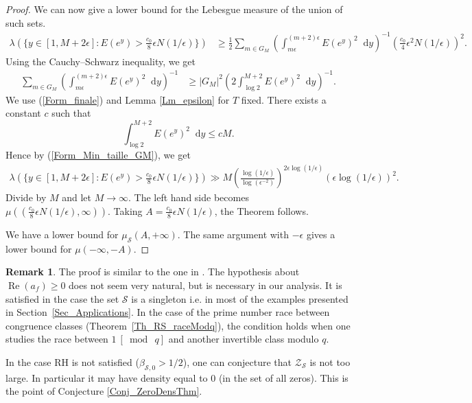\documentclass[a4paper,10pt]{amsart}
\theoremstyle{plain}
\theoremstyle{definition}
\newtheorem{Rk}{Remark}
\begin{document}
\begin{proof}
We can now give a lower bound for the Lebesgue measure of the union of such sets.
\begin{align*}
\lambda\left(\lbrace y\in [1,M+2\epsilon] : E(e^{y})> \frac{c_{0}}{8}\epsilon N(1/\epsilon) \rbrace\right)
&\geq \frac{1}{2} \sum_{m\in G_{M}} \left(\int_{m\epsilon}^{(m+2)\epsilon} E(e^{y})^{2}{\mathop{}\!\mathrm{d}} y\right)^{-1}
\left(\frac{c_{0}}{4}\epsilon^{2} N(1/\epsilon)\right)^{2}.
\end{align*}
Using the Cauchy--Schwarz inequality, we get
\begin{align*}
\sum_{m\in G_{M}} \left(\int_{m\epsilon}^{(m+2)\epsilon} E(e^{y})^{2}{\mathop{}\!\mathrm{d}} y\right)^{-1}
&\geq \lvert G_{M}\rvert^{2}\left(2 \int_{\log 2}^{M+2} E(e^{y})^{2}{\mathop{}\!\mathrm{d}} y \right)^{-1}.
\end{align*}
We use (\ref{Form_finale}) and Lemma \ref{Lm_epsilon} for $T$ fixed.
There exists a constant $c$ such that 
$$\int_{\log 2}^{M+2} E(e^{y})^{2}{\mathop{}\!\mathrm{d}} y \leq cM.$$
Hence by (\ref{Form_Min_taille_GM}), we get
\begin{align*}
\lambda\left(\lbrace y\in [1,M+2\epsilon] : E(e^{y})> \frac{c_{0}}{8}\epsilon N(1/\epsilon) \rbrace\right)
\gg M
\left(\frac{\log(1/\epsilon)}{\log(\epsilon^{-2})}\right)^{2\epsilon\log(1/\epsilon)}
\left(\epsilon \log(1/\epsilon)\right)^{2}.
\end{align*}
Divide by $M$ and let $M\rightarrow\infty$.
The left hand side becomes 
$\mu((\frac{c_{0}}{8}\epsilon N(1/\epsilon),\infty))$.
Taking $A=\frac{c_{0}}{8}\epsilon N(1/\epsilon)$, 
the Theorem follows.

We have a lower bound for $\mu_{\mathcal{S}}(A,+\infty)$.
The same argument with $-\epsilon$ gives a lower bound for
$\mu(-\infty,-A)$.
\end{proof}

\begin{Rk}
	The proof is similar to the one in \cite{RS}.
	The hypothesis about $\operatorname{Re}(a_{f}) \geq 0$ does not seem very natural, but is necessary in our analysis. 	
It is satisfied in the case the set $\mathcal{S}$ is a singleton
i.e. in most of the examples presented in Section~\ref{Sec_Applications}.
In the case of the prime number race between congruence classes (Theorem~\ref{Th_RS_raceModq}), the condition holds when one studies the race between $1\ [\bmod\ q]$ and another invertible class modulo $q$.

\end{Rk}

In the case RH is not satisfied ($\beta_{\mathcal{S},0}> 1/2$), 
one can conjecture that $\mathcal{Z}_{\mathcal{S}}$ is not too large.
In particular it may have density equal to $0$ (in the set of all zeros).
This is the point of Conjecture \ref{Conj_ZeroDensThm}.
\end{document}
